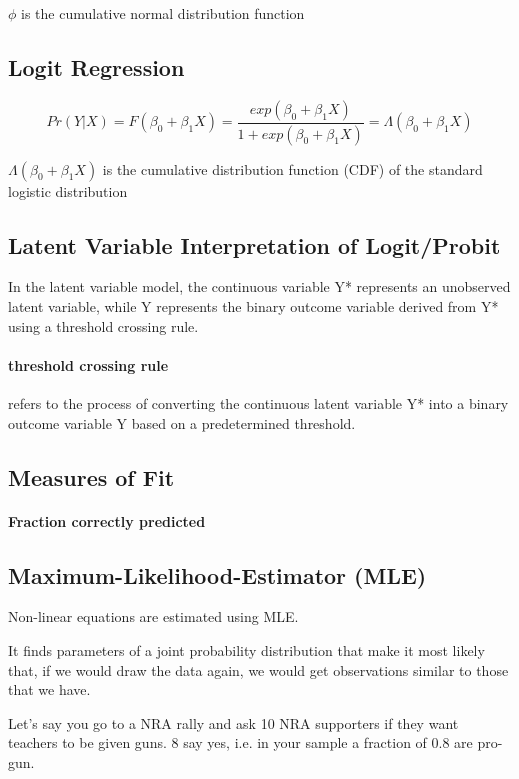 \documentclass[a3paper, 8pt]{extarticle}
\begin{document}
\begin{multicols*}{5}
$\phi$ is the cumulative normal distribution function


\subsection{Logit Regression}

$$Pr(Y|X)=F(\beta_0+\beta_1 X) = \frac{exp(\beta_0 + \beta_1 X)}{1+exp(\beta_0 + \beta_1 X)}= \Lambda(\beta_0 + \beta_1 X) $$

 $\Lambda(\beta_0 + \beta_1 X)$ is the cumulative distribution function (CDF) of the standard logistic distribution

\subsection{Latent Variable Interpretation of Logit/Probit}
In the latent variable model, the continuous variable Y* represents an unobserved latent variable, while Y represents the binary outcome variable derived from Y* using a threshold crossing rule.

\paragraph{threshold crossing rule} refers to the process of converting the continuous latent variable Y* into a binary outcome variable Y based on a predetermined threshold.


\subsection{Measures of Fit}
\paragraph{Fraction correctly predicted}







\subsection{Maximum-Likelihood-Estimator (MLE)}
Non-linear equations are estimated using MLE.

It finds parameters of a joint probability distribution that make it most likely that, if we would draw the data again, we would get observations similar to those that we have.

Let's say you go to a NRA rally and ask 10 NRA supporters if they want teachers to be given guns. 8 say yes, i.e. in your sample a fraction of 0.8 are pro-gun.


\end{multicols*}
\end{document}
